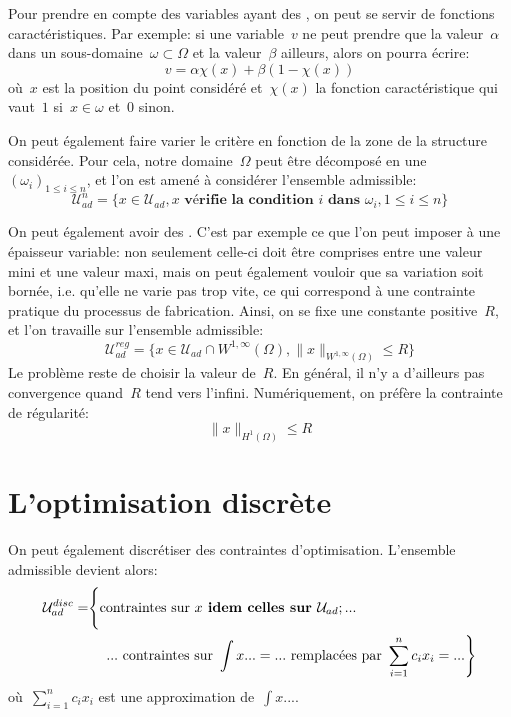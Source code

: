 \medskip
Pour prendre en compte des variables ayant des , on peut se servir de fonctions caractéristiques.
Par  exemple: si une variable~$v$ ne peut prendre que la valeur~$\alpha$ dans un sous-domaine~$\omega\subset\Omega$ et la valeur~$\beta$ ailleurs, alors on pourra écrire:
\begin{equation}
v = \alpha \chi(x) + \beta(1-\chi(x))
\end{equation}
où~$x$ est la position du point considéré et~$\chi(x)$ la fonction caractéristique qui vaut~$1$ si~$x\in\omega$ et~$0$ sinon.

\medskip
On peut également faire varier le critère en fonction de la zone de la structure considérée.
Pour cela, notre domaine~$\Omega$ peut être décomposé en une ~$(\omega_i)_{1\le i\le n}$, et l'on est amené à considérer l'ensemble admissible:
\begin{equation}
\mathcal{U}^n_{ad}=\{ x\in \mathcal{U}_{ad}, x \textbf{ vérifie la condition } i \textbf{ dans } \omega_i, 1\le i\le n\}
\end{equation}

\medskip
On peut également avoir des . C'est par exemple ce que l'on peut imposer à une épaisseur variable: non seulement celle-ci doit être comprises entre une valeur mini et une valeur maxi, mais on peut également vouloir que sa variation soit bornée, i.e. qu'elle ne varie pas trop vite, ce qui correspond à une contrainte pratique du processus de fabrication.
Ainsi, on se fixe une constante positive~$R$, et l'on travaille sur l'ensemble admissible:
\begin{equation}
\mathcal{U}^{reg}_{ad}=\{ x\in \mathcal{U}_{ad} \cap W^{1,\infty}(\Omega), \|x\|_{W^{1,\infty}(\Omega)}\le R\}
\end{equation}
Le problème reste de choisir la valeur de~$R$. En général, il n'y a d'ailleurs pas convergence quand~$R$ tend vers l'infini.
Numériquement, on préfère la contrainte de régularité:
\begin{equation}
\|x\|_{H^1(\Omega)}\le R
\end{equation}

\medskip
\section{L'optimisation discrète}\label{Sec-OptDisc}

On peut également discrétiser des contraintes d'optimisation. L'ensemble admissible devient alors:
\begin{equation}
\begin{split} 
\mathcal{U}^{disc}_{ad} = &\Bigg\{ \text{contraintes sur } x \textbf{ idem celles sur } \mathcal{U}_{ad}; ...\\  
& \left. \quad ... \text{ contraintes sur } \int x...=... \text{ remplacées par } \displaystyle\sum_{i=1}^n c_ix_i = ... \right\}
\end{split}
\end{equation}
où~$\sum_{i=1}^n c_ix_i$ est une approximation de~$\int x...$.

